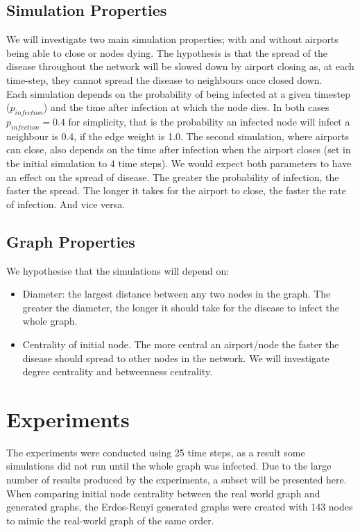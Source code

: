 \documentclass[a4paper,11pt]{article}
\begin{document}
\subsection*{Simulation Properties}
We will investigate two main simulation properties; with and without airports being able to close or nodes dying. The hypothesis is that the spread of the disease throughout the network will be slowed down by airport closing as, at each time-step, they cannot spread the disease to neighbours once closed down. \\
Each simulation depends on the probability of being infected at a given timestep ($p_{infection}$) and the time after infection at which the node dies. In both cases $p_{infection} = 0.4$ for simplicity, that is the probability an infected node will infect a neighbour is 0.4, if the edge weight is 1.0. The second simulation, where airports can close, also depends on the time after infection when the airport closes (set in the initial simulation to 4 time steps). We would expect both parameters to have an effect on the spread of disease. The greater the probability of infection, the faster the spread. The longer it takes for the airport to close, the faster the rate of infection. And vice versa. 

\subsection*{Graph Properties}
We hypothesise that the simulations will depend on:

\begin{itemize}
\item Diameter: the largest distance between any two nodes in the graph. The greater the diameter, the longer it should take for the disease to infect the whole graph.
\item Centrality of initial node. The more central an airport/node the faster the disease should spread to other nodes in the network. We will investigate degree centrality and betweenness centrality.
\end{itemize}

\section{Experiments}

The experiments were conducted using 25 time steps, as a result some simulations did not run until the whole graph was infected. Due to the large number of results produced by the experiments, a subset will be presented here. When comparing initial node centrality between the real world graph and generated graphs, the Erdos-Renyi generated graphs were created with 143 nodes to mimic the real-world graph of the same order.
\end{document}
